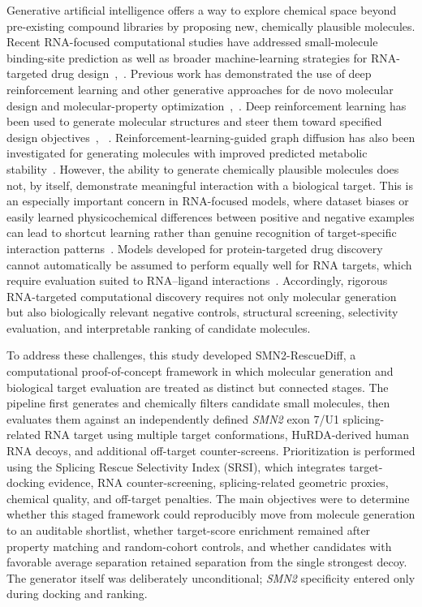 \documentclass[journal]{IEEEtran}
\begin{document}
Generative artificial intelligence offers a way to explore chemical
space beyond pre-existing compound libraries by proposing new,
chemically plausible molecules. Recent RNA-focused computational
studies have addressed small-molecule binding-site prediction as well as
broader machine-learning strategies for RNA-targeted drug
design~\cite{xi2024},~\cite{zhou2024}. Previous work has demonstrated
the use of deep reinforcement learning and other generative approaches
for de novo molecular design and molecular-property
optimization~\cite{olivecrona2017},~\cite{liu2025}. Deep reinforcement
learning has been used to generate molecular structures and steer them
toward specified design objectives~\cite{olivecrona2017},%
~\cite{popova2018}. Reinforcement-learning-guided graph diffusion has
also been investigated for generating molecules with improved predicted
metabolic stability~\cite{liu2025}. However, the ability to generate
chemically plausible molecules does not, by itself, demonstrate
meaningful interaction with a biological target. This is an especially
important concern in RNA-focused models, where dataset biases or easily
learned physicochemical differences between positive and negative
examples can lead to shortcut learning rather than genuine recognition
of target-specific interaction patterns~\cite{wen2026}. Models developed
for protein-targeted drug discovery cannot automatically be assumed to
perform equally well for RNA targets, which require evaluation suited to
RNA--ligand interactions~\cite{karroucha2025}. Accordingly, rigorous
RNA-targeted computational discovery requires not only molecular
generation but also biologically relevant negative controls, structural
screening, selectivity evaluation, and interpretable ranking of
candidate molecules.

To address these challenges, this study developed SMN2-RescueDiff, a
computational proof-of-concept framework in which molecular generation
and biological target evaluation are treated as distinct but connected
stages. The pipeline first generates and chemically filters candidate
small molecules, then evaluates them against an independently defined
\textit{SMN2} exon 7/U1 splicing-related RNA target using multiple target
conformations, HuRDA-derived human RNA decoys, and additional off-target
counter-screens. Prioritization is performed using the Splicing Rescue
Selectivity Index (SRSI), which integrates target-docking evidence, RNA
counter-screening, splicing-related geometric proxies, chemical quality,
and off-target penalties. The main objectives were to determine whether
this staged framework could reproducibly move from molecule generation
to an auditable shortlist, whether target-score enrichment remained
after property matching and random-cohort controls, and whether
candidates with favorable average separation retained separation from
the single strongest decoy. The generator itself was deliberately
unconditional; \textit{SMN2} specificity entered only during docking and
ranking.
\end{document}
